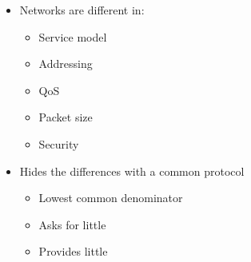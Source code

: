 \begin{itemize}
\begin{itemize}
            \item Networks are different in:
                \begin{itemize}
                    \item Service model
                    \item Addressing
                    \item QoS
                    \item Packet size
                    \item Security
                \end{itemize}
            \item Hides the differences with a common protocol
                \begin{itemize}
                    \item Lowest common denominator
                    \item Asks for little
                    \item Provides little
                \end{itemize}
        \end{itemize}
\end{itemize}

